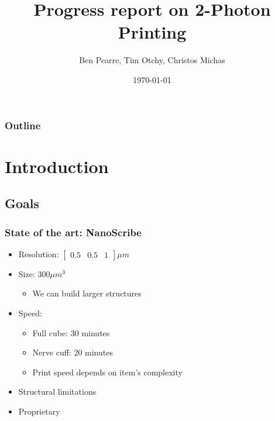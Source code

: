 \documentclass{beamer}
\title[2-Photon Printing]{Progress report on 2-Photon Printing}
\author{Ben Pearre, Tim Otchy, Christos Michas}
\date{\today}
\begin{document}
\begin{frame}
  \titlepage
\end{frame}

\begin{frame}
  \frametitle{Outline}
  \tableofcontents
\end{frame}



\section{Introduction}
\subsection{Goals}

\begin{frame}
  \frametitle{State of the art: NanoScribe}
  \begin{itemize}
  \item Resolution: $\left[ \begin{array}{ccc}0.5 & 0.5 & 1
    \end{array}\right]\mu m$
  \item Size: $300 \mu m^3$
    \begin{itemize}
    \item We can build larger structures
    \end{itemize}
  \item Speed:
    \begin{itemize}
    \item Full cube: 30 minutes
    \item Nerve cuff: 20 minutes
    \item Print speed depends on item's complexity
    \end{itemize}
  \item Structural limitations
  \item Proprietary
  \end{itemize}
\end{frame}
\end{document}
